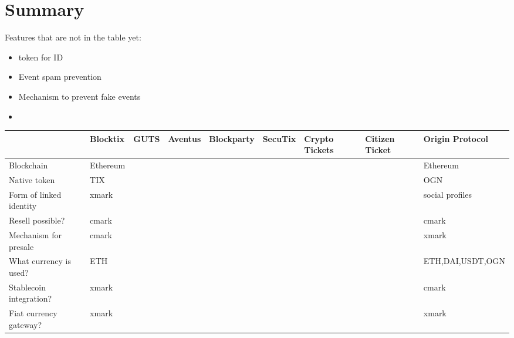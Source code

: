 \section{Summary}

Features that are not in the table yet:
\begin{itemize}
    \item token for ID
    \item Event spam prevention
    \item Mechanism to prevent fake events
    \item 
\end{itemize}



\begin{landscape}

\begin{table}[]
\begin{tabular}{|l|l|l|l|l|l|l|l|l|}
\hline
                               & Blocktix    & GUTS & Aventus & Blockparty & SecuTix & Crypto Tickets & Citizen Ticket & Origin Protocol          \\ \hline
Blockchain                     & Ethereum    &      &         &            &         &                &                & Ethereum                 \\ \hline
Native token                   & TIX         &      &         &            &         &                &                & OGN                      \\ \hline
Form of linked identity        & xmark       &      &         &            &         &                &                & social profiles          \\ \hline
Resell possible?               & cmark       &      &         &            &         &                &                & cmark                    \\ \hline
Mechanism for presale          & cmark       &      &         &            &         &                &                & xmark                    \\ \hline
What currency is used?         & ETH         &      &         &            &         &                &                & ETH,DAI,USDT,OGN         \\ \hline
Stablecoin integration?        & xmark       &      &         &            &         &                &                & cmark                    \\ \hline
Fiat currency gateway?         & xmark       &      &         &            &         &                &                & xmark                    \\ \hline

\end{tabular}
\end{table}
\end{landscape}
